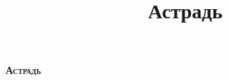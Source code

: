 \documentclass[10pt,a5paper]{article}
\title{Астрадь}
\begin{document}
\begin{titlepage}
	
	\begin{center}
	\vspace*{5 cm}
		{\Huge \bfseries \scshape Астрадь}
	\end{center}
\end{titlepage}

\tableofcontents
\newpage



















\end{document}
